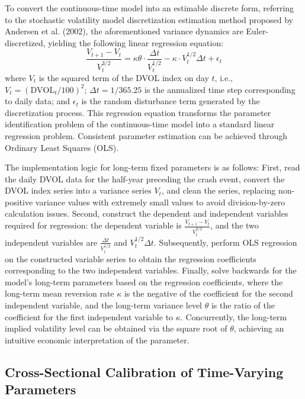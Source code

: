 To convert the continuous-time model into an estimable discrete form, referring to the stochastic volatility model discretization estimation method proposed by Andersen et al. (2002), the aforementioned variance dynamics are Euler-discretized, yielding the following linear regression equation:
\[
\frac{V_{t+1}-V_t}{V_t^{3/2}} = \kappa \theta \cdot \frac{\Delta t}{V_t^{1/2}} - \kappa \cdot V_t^{1/2} \Delta t + \epsilon_t
\]
where $V_t$ is the squared term of the DVOL index on day $t$, i.e., $V_t = (\text{DVOL}_t / 100)^2$; $\Delta t = 1/365.25$ is the annualized time step corresponding to daily data; and $\epsilon_t$ is the random disturbance term generated by the discretization process. This regression equation transforms the parameter identification problem of the continuous-time model into a standard linear regression problem. Consistent parameter estimation can be achieved through Ordinary Least Squares (OLS).

The implementation logic for long-term fixed parameters is as follows: First, read the daily DVOL data for the half-year preceding the crash event, convert the DVOL index series into a variance series $V_t$, and clean the series, replacing non-positive variance values with extremely small values to avoid division-by-zero calculation issues. Second, construct the dependent and independent variables required for regression: the dependent variable is $\frac{V_{t+1}-V_t}{V_t^{3/2}}$, and the two independent variables are $\frac{\Delta t}{V_t^{1/2}}$ and $V_t^{1/2} \Delta t$. Subsequently, perform OLS regression on the constructed variable series to obtain the regression coefficients corresponding to the two independent variables. Finally, solve backwards for the model's long-term parameters based on the regression coefficients, where the long-term mean reversion rate $\kappa$ is the negative of the coefficient for the second independent variable, and the long-term variance level $\theta$ is the ratio of the coefficient for the first independent variable to $\kappa$. Concurrently, the long-term implied volatility level can be obtained via the square root of $\theta$, achieving an intuitive economic interpretation of the parameter.

\subsection{Cross-Sectional Calibration of Time-Varying Parameters}

